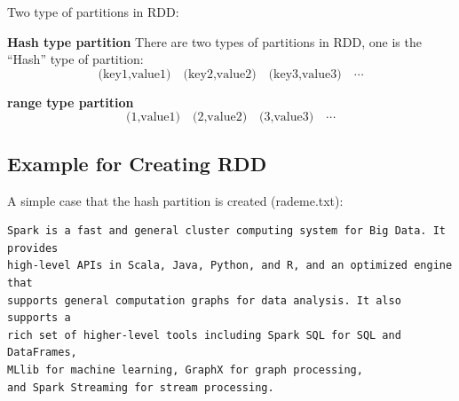 \documentclass[notheorems, aspectratio=54]{beamer}
\begin{document}
\begin{frame}

Two type of partitions in RDD:
\begin{block}{\textbf{Hash type partition}}
 There are two types of partitions in RDD, one is the ``Hash'' type of partition:
 \begin{displaymath}
  \text{(key1,value1)}  \quad \text{(key2,value2)} \quad \text{(key3,value3)}  \quad \cdots
 \end{displaymath}
\end{block}

  \begin{block}{\textbf{range type partition}}
 \begin{displaymath}
  \text{(1,value1)}  \quad \text{(2,value2)} \quad \text{(3,value3)}  \quad \cdots
 \end{displaymath}
\end{block}
 
\end{frame}

\subsection{Example for Creating RDD}
\begin{frame}[fragile]

  A simple case that the hash partition is created (rademe.txt):
  \begin{verbatim}
Spark is a fast and general cluster computing system for Big Data. It provides
high-level APIs in Scala, Java, Python, and R, and an optimized engine that
supports general computation graphs for data analysis. It also supports a
rich set of higher-level tools including Spark SQL for SQL and DataFrames,
MLlib for machine learning, GraphX for graph processing,
and Spark Streaming for stream processing.
  \end{verbatim}

\end{frame}

\end{document}
